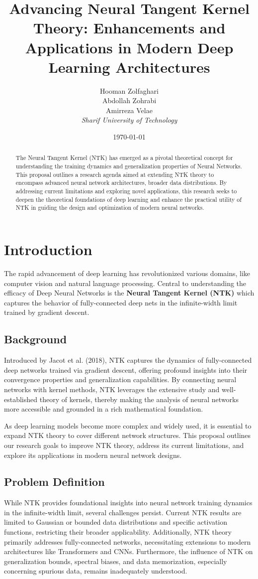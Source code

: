 \documentclass[12pt]{article}
\title{Advancing Neural Tangent Kernel Theory: Enhancements and Applications in Modern Deep Learning Architectures}
\author{
    Hooman Zolfaghari \\
    Abdollah Zohrabi \\
    Amirreza Velae \\
    \vspace{0.5cm}
    \textit{Sharif University of Technology}
}
\date{\today}
\begin{document}
\maketitle

\begin{abstract}
	The Neural Tangent Kernel (NTK) has emerged as a pivotal theoretical concept for understanding the training dynamics and generalization properties of Neural Networks. This proposal outlines a research agenda aimed at extending NTK theory to encompass advanced neural network architectures, broader data distributions. By addressing current limitations and exploring novel applications, this research seeks to deepen the theoretical foundations of deep learning and enhance the practical utility of NTK in guiding the design and optimization of modern neural networks.
\end{abstract}

\section{Introduction}
The rapid advancement of deep learning has revolutionized various domains, like computer vision and natural language processing. Central to understanding the efficacy of Deep Neural Networks is the \textbf{Neural Tangent Kernel (NTK)} which captures the behavior of fully-connected
deep nets in the infinite-width limit trained by gradient descent.~\cite{jacot2018neural}

\subsection{Background}
Introduced by Jacot et al. (2018), NTK captures the dynamics of fully-connected deep networks trained via gradient descent, offering profound insights into their convergence properties and generalization capabilities. By connecting neural networks with kernel methods, NTK leverages the extensive study and well-established theory of kernels, thereby making the analysis of neural networks more accessible and grounded in a rich mathematical foundation.

As deep learning models become more complex and widely used, it is essential to expand NTK theory to cover different network structures. This proposal outlines our research goals to improve NTK theory, address its current limitations, and explore its applications in modern neural network designs.

\subsection{Problem Definition}
While NTK provides foundational insights into neural network training dynamics in the infinite-width limit, several challenges persist. Current NTK results are limited to Gaussian or bounded data distributions and specific activation functions, restricting their broader applicability. Additionally, NTK theory primarily addresses fully-connected networks, necessitating extensions to modern architectures like Transformers and CNNs. Furthermore, the influence of NTK on generalization bounds, spectral biases, and data memorization, especially concerning spurious data, remains inadequately understood.
\end{document}
